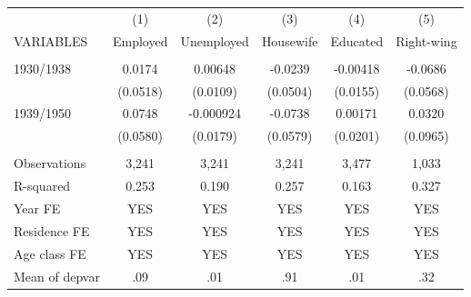 \begin{tabular}{lccccc} \hline
 & (1) & (2) & (3) & (4) & (5) \\
VARIABLES & Employed & Unemployed & Housewife & Educated & Right-wing \\ \hline
 &  &  &  &  &  \\
1930/1938 & 0.0174 & 0.00648 & -0.0239 & -0.00418 & -0.0686 \\
 & (0.0518) & (0.0109) & (0.0504) & (0.0155) & (0.0568) \\
1939/1950 & 0.0748 & -0.000924 & -0.0738 & 0.00171 & 0.0320 \\
 & (0.0580) & (0.0179) & (0.0579) & (0.0201) & (0.0965) \\
 &  &  &  &  &  \\
Observations & 3,241 & 3,241 & 3,241 & 3,477 & 1,033 \\
R-squared & 0.253 & 0.190 & 0.257 & 0.163 & 0.327 \\
Year FE & YES & YES & YES & YES & YES \\
Residence FE & YES & YES & YES & YES & YES \\
Age class FE & YES & YES & YES & YES & YES \\
 Mean of depvar & .09 & .01 & .91 & .01 & .32 \\ \hline
\end{tabular}
